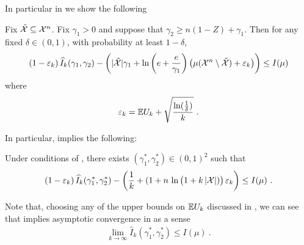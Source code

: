 %
In particular in  we show the following
%
%
\begin{theorem}
  \label{thm:emp-wav-MI}
  Fix $\tilde {{\mathcal{X}}} \subseteq {\mathcal{X}}^n$.
  Fix $\gamma_1 > 0$ and suppose that $\gamma_2 \geq n (1-Z) + \gamma_1$.
  Then for any fixed $\delta \in (0,1)$, with probability at least $1-\delta$,
  \begin{align*}
    (1 - \varepsilon_k) \, \widehat I_k(\gamma_1, \gamma_2)
    -
    \left( 
    |\tilde {{\mathcal{X}}}|\gamma_1
    +
    \ln \left(  e + \frac{e}{\gamma_1} \right) \left(  \mu({\mathcal{X}}^n \setminus \tilde{{\mathcal{X}}}) + \varepsilon_k  \right)
     \right)
    \leq
    I(\mu)
  \end{align*}
  where
  \begin{align*}
    \varepsilon_k = \mathbb{E} U_k + \sqrt{\frac{\ln(\frac{1}{\delta})}{k}}~.
  \end{align*}
\end{theorem}
%
In particular,  implies the following:
%
\begin{corollary}
  \label{cor:MI-1}
  Under conditions of , there exists $(\gamma^*_1, \gamma^*_2) \in (0, 1)^2$ such that
  \begin{align*}
    (1 - \varepsilon_k) \, \widehat I_k(\gamma^*_1, \gamma_2^*)
    -
    \left( 
    \frac{1}{k}
    +
    (1+
    n \, \ln \big( 1 + k \, |{\mathcal{X}}|) \big) \, \varepsilon_k
     \right)
    \leq
    I(\mu)~.
  \end{align*}
\end{corollary}
%

%
Note that, choosing any of the upper bounds on $\mathbb{E} U_k$ discussed in , we can see that  implies asymptotic convergence in as a sense
\begin{align*}
  \lim_{k \to \infty} \widehat I_k(\gamma^*_1, \gamma_2^*) \leq I(\mu)~.
\end{align*}

